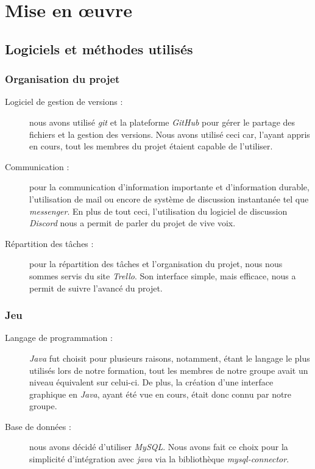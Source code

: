 \documentclass[a4paper, titlepage]{livret}
\begin{document}
    
    
    
    

\chapter{Mise en œuvre}
  \section{Logiciels et méthodes utilisés}
  \subsection{Organisation du projet}
     \begin{description}
       \item[Logiciel de gestion de versions :] nous avons utilisé \textit{git} et la plateforme \textit{GitHub} pour gérer le partage des fichiers et la gestion des versions. Nous avons utilisé ceci car, l'ayant appris en cours, tout les membres du projet étaient capable de l'utiliser.
       \item[Communication :] pour la communication d'information importante et d'information durable, l'utilisation de mail ou encore de système de discussion instantanée tel que \textit{messenger}. En plus de tout ceci, l'utilisation du logiciel de discussion \textit{Discord} nous a permit de parler du projet de vive voix.
       \item[Répartition des tâches :] pour la répartition des tâches et l'organisation du projet, nous nous sommes servis du site \textit{Trello}. Son interface simple, mais efficace, nous a permit de suivre l'avancé du projet.
     \end{description}
  
  \subsection{Jeu}
    \begin{description}
      \item[Langage de programmation :] \textit{Java} fut choisit pour plusieurs raisons, notamment, étant le langage le plus utilisés lors de notre formation, tout les membres de notre groupe avait un niveau équivalent sur celui-ci. De plus, la création d'une interface graphique en \textit{Java}, ayant été vue en cours, était donc connu par notre groupe.   
      \item[Base de données :] nous avons décidé d'utiliser \textit{MySQL}. Nous avons fait ce choix pour la simplicité d’intégration avec \textit{java} via la bibliothèque \textit{mysql-connector}.
      
    \end{description}
  
\end{document}
